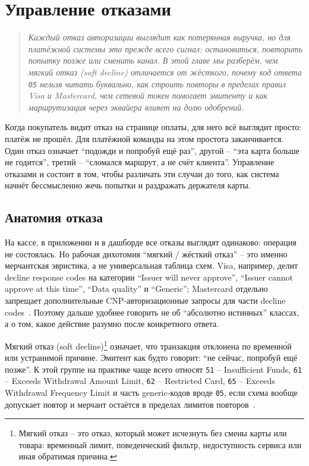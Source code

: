 
\chapter{Управление отказами}
\label{ch:decline-management}
\begin{quote}
  \itshape
  Каждый отказ авторизации выглядит как потерянная выручка, но для
  платёжной системы это прежде всего сигнал: остановиться, повторить
  попытку позже или сменить канал. В этой главе мы разберём, чем мягкий
  отказ (soft decline) отличается от жёсткого, почему код ответа
  \texttt{05} нельзя читать буквально, как строить повторы в пределах правил
  Visa и Mastercard, чем сетевой токен помогает
  эмитенту и как маршрутизация через эквайера влияет на долю одобрений.
\end{quote}

Когда покупатель видит отказ на странице оплаты, для него всё выглядит
просто: платёж не прошёл. Для платёжной команды на этом простота
заканчивается. Один отказ означает \enquote{подожди и попробуй ещё раз},
другой -- \enquote{эта карта больше не годится}, третий -- \enquote{сломался
маршрут, а не счёт клиента}. Управление отказами и состоит в том, чтобы
различать эти случаи до того, как система начнёт бессмысленно жечь
попытки и раздражать держателя карты.

\section{Анатомия отказа}
\label{sec:decline-anatomy}

На кассе, в приложении и в дашборде все отказы выглядят одинаково:
операция не состоялась. Но рабочая дихотомия \enquote{мягкий / жёсткий
отказ} -- это именно мерчантская эвристика, а не универсальная таблица
схем. Visa, например, делит decline response codes на категории
\enquote{Issuer will never approve}, \enquote{Issuer cannot approve at this
time}, \enquote{Data quality} и \enquote{Generic}; Mastercard
отдельно запрещает дополнительные CNP-авторизационные запросы для части
decline codes~\cite{visa-core-rules}\cite{mc-tpr}. Поэтому дальше
удобнее говорить не об \enquote{абсолютно истинных} классах, а о том,
какое действие разумно после конкретного ответа.

Мягкий отказ (soft decline)\footnote{Мягкий отказ -- это отказ, который
  может исчезнуть без смены карты или товара: временный лимит,
  поведенческий фильтр, недоступность сервиса или иная обратимая
  причина.} означает, что транзакция отклонена по
временн\'{о}й или устранимой причине. Эмитент как будто говорит:
\enquote{не сейчас, попробуй ещё позже}. К этой группе на практике чаще
всего относят \texttt{51} -- Insufficient Funds, \texttt{61} -- Exceeds Withdrawal
Amount Limit, \texttt{62} -- Restricted Card, \texttt{65} -- Exceeds Withdrawal
Frequency Limit и часть generic-кодов вроде \texttt{05}, если схема вообще
допускает повтор и мерчант остаётся в пределах лимитов
повторов~\cite{visa-core-rules}.

